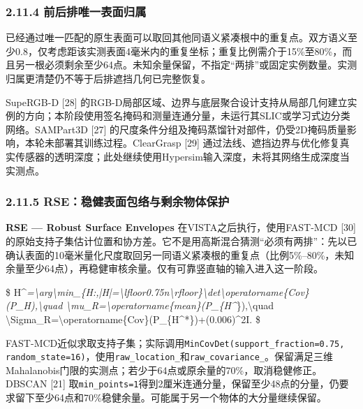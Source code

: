\documentclass[UTF8,fontset=fandol]{ctexart}
\begin{document}
\subsubsection*{2.11.4 前后排唯一表面归属}

已经通过唯一匹配的原生表面可以取回其他同语义紧凑根中的重复点。双方语义至少0.8，仅考虑距该实测表面4毫米内的重复坐标；重复比例需介于15\%至80\%，而且另一根必须剩余至少64点。未知余量保留，不指定“两排”或固定实例数量。实测归属更清楚仍不等于后排遮挡几何已完整恢复。



SupeRGB-D [28] 的RGB-D局部区域、边界与底层聚合设计支持从局部几何建立实例的方向；本阶段使用签名掩码和测量连通分量，未运行其SLIC或学习式边分类网络。SAMPart3D [27] 的尺度条件分组及掩码蒸馏针对部件，仍受2D掩码质量影响，本轮未部署其训练过程。ClearGrasp [29] 通过法线、遮挡边界与优化修复真实传感器的透明深度；此处继续使用Hypersim输入深度，未将其网络生成深度当实测点。



\subsubsection*{2.11.5 RSE：稳健表面包络与剩余物体保护}

\textbf{RSE — Robust Surface Envelopes} 在VISTA之后执行，使用FAST-MCD [30] 的原始支持子集估计位置和协方差。它不是用高斯混合猜测“必须有两排”：先以已确认表面的10毫米量化尺度取回另一同语义紧凑根的重复点（比例5\%–80\%，未知余量至少64点），再稳健审核余量。仅有可靠竖直轴的输入进入这一阶段。



\$
H\textasciicircum{}\emph{=\textbackslash{}arg\textbackslash{}min\_\{H:,|H|=\textbackslash{}lfloor0.75n\textbackslash{}rfloor\}\textbackslash{}det\textbackslash{}operatorname\{Cov\}(P\_H),\textbackslash{}quad
\textbackslash{}mu\_R=\textbackslash{}operatorname\{mean\}(P\_\{H\textasciicircum{}}\}),\textbackslash{}quad \textbackslash{}Sigma\_R=\textbackslash{}operatorname\{Cov\}(P\_\{H\textasciicircum{}*\})+(0.006)\textasciicircum{}2I.
\$



FAST-MCD近似求取支持子集；实际调用\texttt{MinCovDet(support\_\allowbreak{}fraction=0.\allowbreak{}75, random\_\allowbreak{}state=16)}，使用\texttt{raw\_\allowbreak{}location\_\allowbreak{}}和\texttt{raw\_\allowbreak{}covariance\_\allowbreak{}}。保留满足三维Mahalanobis门限的实测点；若少于64点或原余量的70\%，取消稳健修正。DBSCAN [21] 取\texttt{min\_\allowbreak{}points=1}得到2厘米连通分量，保留至少48点的分量，仍要求留下至少64点和70\%稳健余量。可能属于另一个物体的大分量继续保留。
\end{document}
